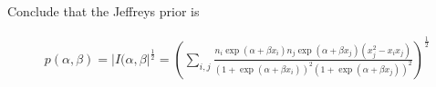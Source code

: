 \documentclass[11pt]{article}
\begin{document}
\begin{enumerate}
\begin{enumerate}
	Conclude that the Jeffreys prior is
	
	\begin{align*}
		p(\alpha,\beta) = |I(\alpha,\beta|^\frac{1}{2} = \left(\sum_{i,j}{\frac{n_{i}\exp(\alpha+\beta x_{i})n_{j}\exp(\alpha+\beta x_{j})(x_{j}^{2}-x_{i}x_{j})}{(1+\exp(\alpha+\beta x_{i}))^{2}(1+\exp(\alpha+\beta x_{j}))^{2}}}\right)^{\frac{1}{2}}
	\end{align*}
	
\end{enumerate}
%
%
%
%
%
%
%



\end{enumerate}
\end{document}
